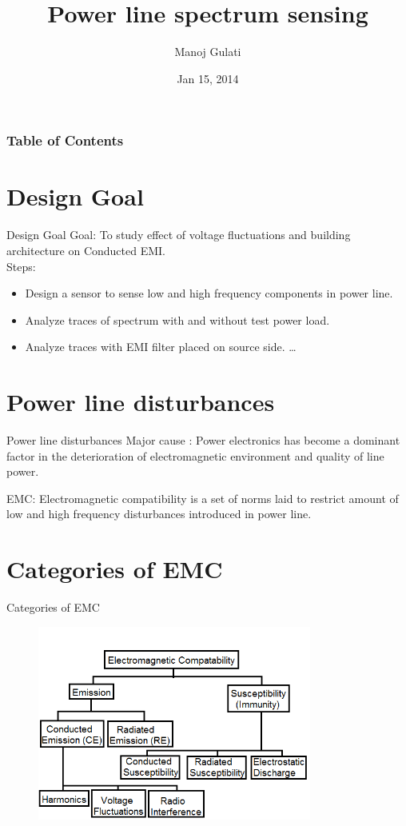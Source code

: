 \documentclass{beamer}
\title{ Power line spectrum sensing\\}
\author{Manoj Gulati}
\institute{IIIT-Delhi\\www.iiitd.ac.in}
\date{Jan 15, 2014}
\begin{document}
\begin{frame}
\titlepage
\end{frame}

\begin{frame}
\frametitle{Table of Contents}
\tableofcontents %
\end{frame}

\section{Design Goal} 
\begin{frame}{Design Goal}
Goal: To study effect of voltage fluctuations and building architecture on Conducted EMI.\\
Steps: 
\begin{itemize}
  \item Design a sensor to sense low and high frequency components in power line.
  \item Analyze traces of spectrum with and without test power load.
  \item Analyze traces with EMI filter placed on source side. 
  \ldots
\end{itemize}
\end{frame}

\section{Power line disturbances} 
\begin{frame}{Power line disturbances}
Major cause : Power electronics has become a dominant factor in the deterioration of electromagnetic environment and quality of line power.

EMC: Electromagnetic compatibility is a set of norms laid to restrict amount of low and high frequency disturbances introduced in power line. 
\end{frame}

\section{Categories of EMC} 
\begin{frame}{Categories of EMC}
\begin{figure}[ht!]
\includegraphics[width=90mm]{EMC_CAT.png}
\label{overflow}
\end{figure}
\end{frame}
\end{document}
